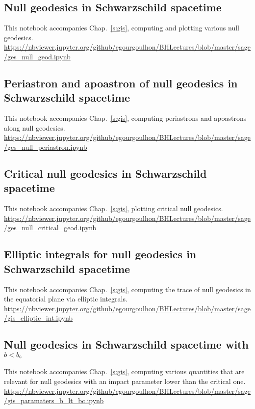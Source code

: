 \subsection{Null geodesics in Schwarzschild spacetime} \label{s:sam:ges_null_geod}
%
This notebook accompanies Chap.~\ref{s:gis}, computing and plotting various
null geodesics.\\[1ex]
{\footnotesize
\url{https://nbviewer.jupyter.org/github/egourgoulhon/BHLectures/blob/master/sage/ges_null_geod.ipynb}
}

\subsection{Periastron and apoastron of null geodesics in Schwarzschild spacetime} \label{s:sam:ges_null_periastron}
%
This notebook accompanies Chap.~\ref{s:gis}, computing periastrons and apoastrons
along null geodesics.\\[1ex]
{\footnotesize
\url{https://nbviewer.jupyter.org/github/egourgoulhon/BHLectures/blob/master/sage/ges_null_periastron.ipynb}
}

\subsection{Critical null geodesics in Schwarzschild spacetime} \label{s:sam:ges_null_critical_geod}
%
This notebook accompanies Chap.~\ref{s:gis}, plotting critical null geodesics.\\[1ex]
{\footnotesize
\url{https://nbviewer.jupyter.org/github/egourgoulhon/BHLectures/blob/master/sage/ges_null_critical_geod.ipynb}
}

\subsection{Elliptic integrals for null geodesics in Schwarzschild spacetime} \label{s:sam:gis_elliptic_int}
%
This notebook accompanies Chap.~\ref{s:gis}, computing the trace of null
geodesics in the equatorial plane via elliptic integrals.\\[1ex]
{\footnotesize
\url{https://nbviewer.jupyter.org/github/egourgoulhon/BHLectures/blob/master/sage/gis_elliptic_int.ipynb}
}

\subsection{Null geodesics in Schwarzschild spacetime with $b<b_{\rm c}$} \label{s:sam:gis_paramaters_b_lt_bc}
%
This notebook accompanies Chap.~\ref{s:gis}, computing various quantities that
are relevant for null geodesics with an impact parameter lower than the critical one.\\[1ex]
{\footnotesize
\url{https://nbviewer.jupyter.org/github/egourgoulhon/BHLectures/blob/master/sage/gis_paramaters_b_lt_bc.ipynb}
}

